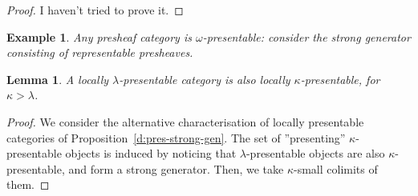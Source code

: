 \documentclass{article}
\newtheorem{example}[theorem]{Example}
\newtheorem{lemma}[theorem]{Lemma}
\begin{document}
\begin{proof}
  I haven't tried to prove it.
  \end{proof}
\begin{example}
  Any presheaf category is $\omega$-presentable: consider the strong generator consisting
  of representable presheaves.
\end{example}
\begin{lemma}
  A locally $\lambda$-presentable category is also locally $\kappa$-presentable, for $\kappa > \lambda$.
\end{lemma}
\begin{proof}
  We consider the alternative characterisation of locally presentable categories
  of Proposition~\ref{d:pres-strong-gen}.
  The set of ''presenting'' $\kappa$-presentable objects is induced by noticing that
  $\lambda$-presentable objects are also $\kappa$-presentable, and form a strong
  generator. Then, we take $\kappa$-small colimits of them.
\end{proof}
\end{document}
